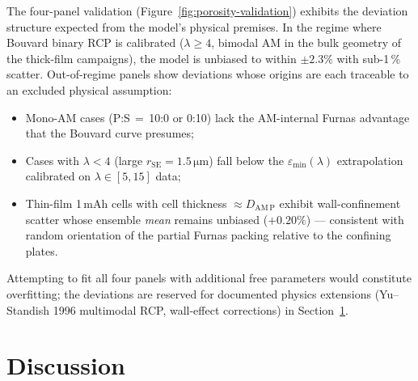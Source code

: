 \documentclass[11pt, a4paper]{article}
\begin{document}
The four-panel validation (Figure~\ref{fig:porosity-validation})
exhibits the deviation structure expected from the model's
physical premises. In the regime where Bouvard binary RCP is
calibrated ($\lambda \ge 4$, bimodal AM in the bulk geometry of
the thick-film campaigns), the model is unbiased to within
$\pm 2.3\%$ with sub-1\,\% scatter. Out-of-regime panels show
deviations whose origins are each traceable to an excluded
physical assumption:
\begin{itemize}
\item Mono-AM cases (P:S\,$=$\,10:0 or 0:10) lack the AM-internal
      Furnas advantage that the Bouvard curve presumes;
\item Cases with $\lambda < 4$ (large $r_{\mathrm{SE}} =
      1.5\,\si{\micro\metre}$) fall below the
      $\varepsilon_{\min}(\lambda)$ extrapolation calibrated on
      $\lambda \in [5,15]$ data;
\item Thin-film 1\,mAh cells with cell thickness $\approx
      D_{\mathrm{AM\,P}}$ exhibit wall-confinement scatter whose
      ensemble \emph{mean} remains unbiased ($+0.20\%$) ---
      consistent with random orientation of the partial Furnas
      packing relative to the confining plates.
\end{itemize}
Attempting to fit all four panels with additional free parameters
would constitute overfitting; the deviations are reserved for
documented physics extensions (Yu--Standish 1996 multimodal RCP,
wall-effect corrections) in Section~\ref{sec:discussion}.

\section{Discussion}
\label{sec:discussion}
\end{document}
